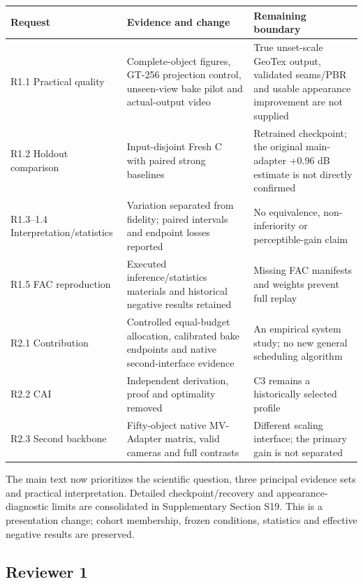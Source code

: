 \documentclass[
  10pt,
]{article}
\begin{document}
\begin{longtable}[]{@{}
  >{\raggedright\arraybackslash}p{}
  >{\raggedright\arraybackslash}p{}
  >{\raggedright\arraybackslash}p{}@{}}
\toprule
Request & Evidence and change & Remaining boundary \\
\midrule
\endhead
R1.1 Practical quality & Complete-object figures, GT-256 projection
control, unseen-view bake pilot and actual-output video & True
unset-scale GeoTex output, validated seams/PBR and usable appearance
improvement are not supplied \\
R1.2 Holdout comparison & Input-disjoint Fresh C with paired strong
baselines & Retrained checkpoint; the original main-adapter +0.96 dB
estimate is not directly confirmed \\
R1.3--1.4 Interpretation/statistics & Variation separated from fidelity;
paired intervals and endpoint losses reported & No equivalence,
non-inferiority or perceptible-gain claim \\
R1.5 FAC reproduction & Executed inference/statistics materials and
historical negative results retained & Missing FAC manifests and weights
prevent full replay \\
R2.1 Contribution & Controlled equal-budget allocation, calibrated bake
endpoints and native second-interface evidence & An empirical system
study; no new general scheduling algorithm \\
R2.2 CAI & Independent derivation, proof and optimality removed & C3
remains a historically selected profile \\
R2.3 Second backbone & Fifty-object native MV-Adapter matrix, valid
cameras and full contrasts & Different scaling interface; the primary
gain is not separated \\
\bottomrule
\end{longtable}

The main text now prioritizes the scientific question, three principal
evidence sets and practical interpretation. Detailed checkpoint/recovery
and appearance-diagnostic limits are consolidated in Supplementary
Section S19. This is a presentation change; cohort membership, frozen
conditions, statistics and effective negative results are preserved.

\hypertarget{reviewer-1}{%
\subsection{Reviewer 1}\label{reviewer-1}}
\end{document}
